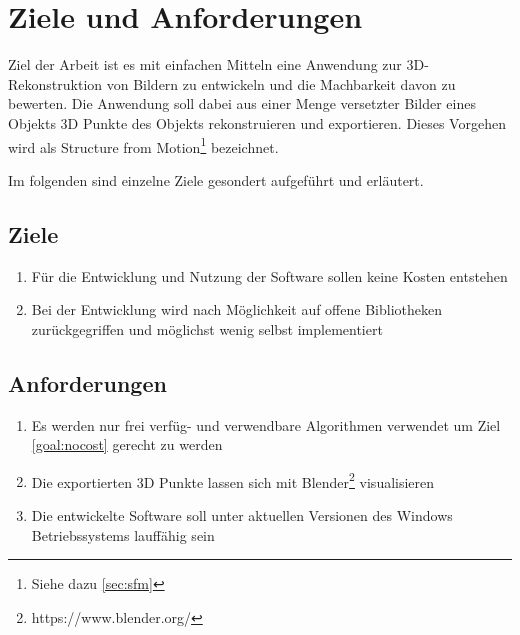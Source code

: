 
\chapter{Ziele und Anforderungen}\label{sec:goals}
Ziel der Arbeit ist es mit einfachen Mitteln eine Anwendung zur 3D-Rekonstruktion von Bildern zu entwickeln und die Machbarkeit davon zu bewerten.
Die Anwendung soll dabei aus einer Menge versetzter Bilder eines Objekts 3D Punkte des Objekts rekonstruieren und exportieren.
Dieses Vorgehen wird als Structure from Motion\footnote{Siehe dazu \autoref{sec:sfm} } bezeichnet.

Im folgenden sind einzelne Ziele gesondert aufgeführt und erläutert.

\section{Ziele}
\begin{enumerate}
\item \label{goal:nocost} Für die Entwicklung und Nutzung der Software sollen keine Kosten entstehen
\item Bei der Entwicklung wird nach Möglichkeit auf offene Bibliotheken zurückgegriffen und möglichst wenig selbst implementiert
\end{enumerate}


\section{Anforderungen}
\begin{enumerate}
\item Es werden nur frei verfüg- und verwendbare Algorithmen verwendet um Ziel \autoref{goal:nocost} gerecht zu werden
\item  Die exportierten 3D Punkte lassen sich mit Blender\footnote{https://www.blender.org/} visualisieren
\item Die entwickelte Software soll unter aktuellen Versionen des Windows Betriebssystems lauffähig sein
\end{enumerate}
